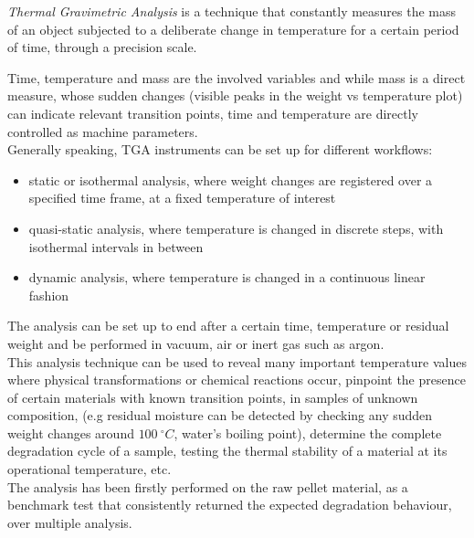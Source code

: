\documentclass{article}
\begin{document}
        \textit{Thermal Gravimetric Analysis} is a technique that constantly measures the mass of an object subjected to a deliberate 
        change in temperature for a certain period of time, through a precision scale. 

        Time, temperature and mass are the involved variables and while mass is a direct measure, whose sudden changes (visible peaks
        in the weight vs temperature plot) can indicate relevant transition points, time and temperature are directly controlled 
        as machine parameters. \\ 

        Generally speaking, TGA instruments can be set up for different workflows: 

                \begin{itemize}
                    \item static or isothermal analysis, where weight changes are registered over a specified time frame, 
                    at a fixed temperature of interest
                    \item quasi-static analysis, where temperature is changed in discrete steps, with isothermal intervals in between 
                    \item dynamic analysis, where temperature is changed in a continuous linear fashion
                \end{itemize}

            The analysis can be set up to end after a certain time, temperature or residual weight and be performed 
            in vacuum, air or inert gas such as argon. \\

        This analysis technique can be used to reveal many important temperature values where physical transformations or chemical 
        reactions occur, pinpoint the presence of certain materials with known transition points, in samples of unknown composition, 
        (e.g residual moisture can be detected by checking any sudden weight changes around $100 \ ^{\circ}C $, water's boiling point), 
        determine the complete degradation cycle of a sample, testing the thermal stability of a material at its operational temperature, etc. \\ 

        The analysis has been firstly performed on the raw pellet material, as a benchmark test
        that consistently returned the expected degradation behaviour, over multiple analysis. 
\end{document}
